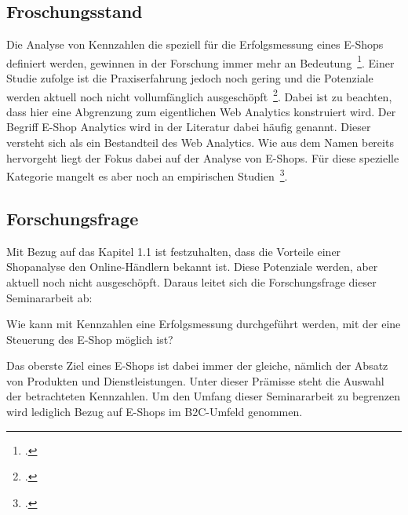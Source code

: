 \subsection{Froschungsstand}
Die Analyse von Kennzahlen die speziell für die Erfolgsmessung eines E-Shops definiert werden, gewinnen in der Forschung immer mehr an Bedeutung~\footcite[Vgl. ][Seite 1]{Hienerth.2010}. Einer Studie zufolge ist die Praxiserfahrung jedoch noch gering und die Potenziale werden aktuell noch nicht vollumfänglich ausgeschöpft~\footcite[Vgl. ][Seite 9, 15]{Zumstein.2011}. Dabei ist zu beachten, dass hier eine Abgrenzung zum eigentlichen Web Analytics konstruiert wird. Der Begriff E-Shop Analytics wird in der Literatur dabei häufig genannt. Dieser versteht sich als ein Bestandteil des Web Analytics. Wie aus dem Namen bereits hervorgeht liegt der Fokus dabei auf der Analyse von E-Shops. Für diese spezielle Kategorie mangelt es aber noch an empirischen Studien~\footcite[Vgl. ][Seite 5]{Zumstein.2012}.

\subsection{Forschungsfrage}
Mit Bezug auf das Kapitel 1.1 ist festzuhalten, dass die Vorteile einer Shopanalyse den Online-Händlern bekannt ist. Diese Potenziale werden, aber aktuell noch nicht ausgeschöpft. Daraus leitet sich die Forschungsfrage dieser Seminararbeit ab:

Wie kann mit Kennzahlen eine Erfolgsmessung durchgeführt werden, mit der eine Steuerung des E-Shop möglich ist?

Das oberste Ziel eines E-Shops ist dabei immer der gleiche, nämlich der Absatz von Produkten und Dienstleistungen. Unter dieser Prämisse steht die Auswahl der betrachteten Kennzahlen. Um den Umfang dieser Seminararbeit zu begrenzen wird lediglich Bezug auf E-Shops im B2C-Umfeld genommen.

